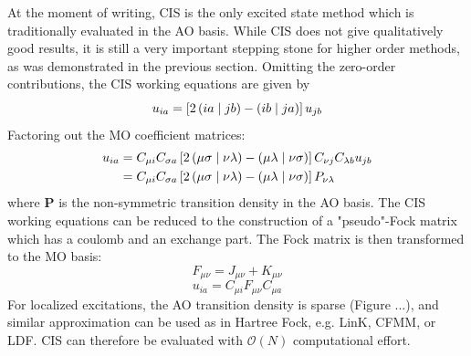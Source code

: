 At the moment of writing, CIS is the only excited state method which is traditionally evaluated in the AO basis. While CIS does not give qualitatively good results, it is still a very important stepping stone for higher order methods, as was demonstrated in the previous section. Omitting the zero-order contributions, the CIS working equations are given by
\begin{equation}
u_{ia} = \left[ 2 \left( ia \mid jb \right) - \left( ib \mid ja \right) \right] u_{jb}
\end{equation}
\noindent Factoring out the MO coefficient matrices:
\begin{equation}
\begin{split}
u_{ia} &= C_{\mu i} C_{\sigma a} \left[ 2 \left( \mu\sigma \mid \nu\lambda \right) - \left( \mu\lambda \mid \nu\sigma \right) \right] C_{\nu j} C_{\lambda b} u_{jb} \\ 
&= C_{\mu i} C_{\sigma a} \left[ 2 \left( \mu\sigma \mid \nu\lambda \right) - \left( \mu\lambda \mid \nu\sigma \right) \right] P_{\nu\lambda} 
\end{split}
\end{equation} 
\noindent where $\mathbf{P}$ is the non-symmetric transition density in the AO basis. The CIS working equations can be reduced to the construction of a "pseudo"-Fock matrix which has a coulomb and an exchange part. The Fock matrix is then transformed to the MO basis:
\begin{equation}
F_{\mu\nu} = J_{\mu\nu} + K_{\mu\nu}  
\end{equation}
\begin{equation}
u_{ia} = C_{\mu i} F_{\mu\nu} C_{\mu a}  
\end{equation}
\noindent For localized excitations, the AO transition density is sparse (Figure ...), and similar approximation can be used as in Hartree Fock, e.g. LinK, CFMM, or LDF. CIS can therefore be evaluated with $\mathcal{O}(N)$ computational effort. 

